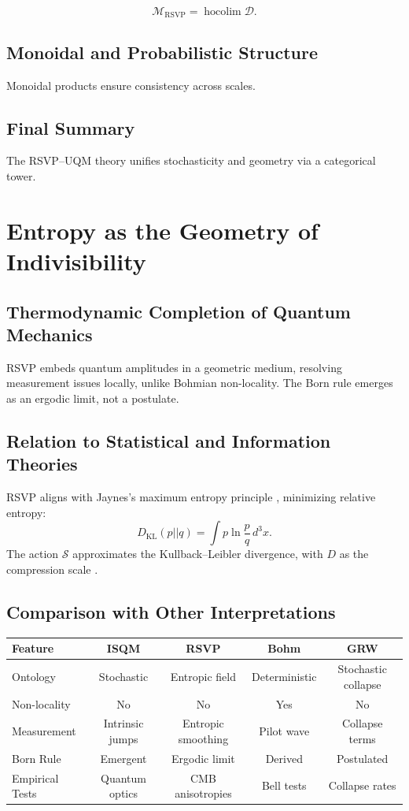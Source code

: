 \documentclass[12pt]{article}
\begin{document}
\[
\mathcal{M}_{\mathrm{RSVP}} = \operatorname{hocolim} \mathcal{D}.
\]

\subsection{Monoidal and Probabilistic Structure}

Monoidal products ensure consistency across scales.

\subsection{Final Summary}

The RSVP–UQM theory unifies stochasticity and geometry via a categorical tower.

\section{Entropy as the Geometry of Indivisibility}

\subsection{Thermodynamic Completion of Quantum Mechanics}

RSVP embeds quantum amplitudes in a geometric medium, resolving measurement issues locally, unlike Bohmian non-locality. The Born rule emerges as an ergodic limit, not a postulate.

\subsection{Relation to Statistical and Information Theories}

RSVP aligns with Jaynes’s maximum entropy principle \citep{Jaynes1957}, minimizing relative entropy:
\[
D_{\text{KL}}(p || q) = \int p \ln \frac{p}{q} \, d^3x.
\]
The action \(\mathcal{S}\) approximates the Kullback–Leibler divergence, with \(D\) as the compression scale \citep{Grunwald2007}.

\subsection{Comparison with Other Interpretations}

\begin{center}
\begin{tabular}{@{}lcccc@{}}
\toprule
\textbf{Feature} & \textbf{ISQM} & \textbf{RSVP} & \textbf{Bohm} & \textbf{GRW} \\
\midrule
Ontology & Stochastic & Entropic field & Deterministic & Stochastic collapse \\
Non-locality & No & No & Yes & No \\
Measurement & Intrinsic jumps & Entropic smoothing & Pilot wave & Collapse terms \\
Born Rule & Emergent & Ergodic limit & Derived & Postulated \\
Empirical Tests & Quantum optics & CMB anisotropies & Bell tests & Collapse rates \\
\bottomrule
\end{tabular}
\end{center}
\end{document}
